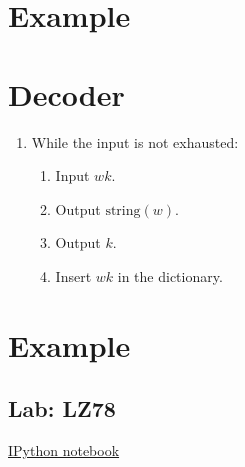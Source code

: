 \section{Example}
\section{Decoder}

\begin{enumerate}
\tightlist
\item
  While the input is not exhausted:
  \begin{enumerate}
  \tightlist
  \item
    Input \(wk\).
  \item
    Output \(\text{string}(w)\).
  \item
    Output \(k\).
  \item
    Insert \(wk\) in the dictionary.
  \end{enumerate}
\end{enumerate}

\section{Example}

\subsection{Lab: LZ78}
\href{https://nbviewer.jupyter.org/github/vicente-gonzalez-ruiz/LZ78/blob/master/LZ78.ipynb}{IPython notebook}


